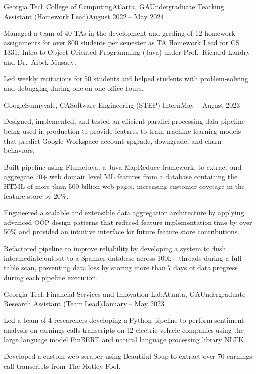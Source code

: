 \documentclass{article}
\begin{document}
\begin{flushleft}
    \begin{experience}{Georgia Tech College of Computing}{Atlanta, GA}{Undergraduate Teaching Assistant (Homework Lead)}{August 2022 -- May 2024}
        \item Managed a team of 40 TAs in the development and grading of 12 homework assignments for over 800 students per semester as TA Homework Lead for CS 1331: Intro to Object-Oriented Programming (Java) under Prof.~Richard Landry and Dr.~Aibek Musaev.
        \item Led weekly recitations for 50 students and helped students with problem-solving and debugging during one-on-one office hours.
    \end{experience}

    \begin{experience}{Google}{Sunnyvale, CA}{Software Engineering (STEP) Intern}{May -- August 2023}
        \item Designed, implemented, and tested an efficient parallel-processing data pipeline being used in production to provide features to train machine learning models that predict Google Workspace account upgrade, downgrade, and churn behaviors.
        \item Built pipeline using FlumeJava, a Java MapReduce framework, to extract and aggregate 70+ web domain level ML features from a database containing the HTML of more than 500 billion web pages, increasing customer coverage in the feature store by 20\%.
        \item Engineered a scalable and extensible data aggregation architecture by applying advanced OOP design patterns that reduced feature implementation time by over 50\% and provided an intuitive interface for future feature store contributions.
        \item Refactored pipeline to improve reliability by developing a system to flush intermediate output to a Spanner database across 100k+ threads during a full table scan, preventing data loss by storing more than 7 days of data progress during each pipeline execution.
    \end{experience}

    \begin{experience}{Georgia Tech Financial Services and Innovation Lab}{Atlanta, GA}{Undergraduate Research Assistant (Team Lead)}{January -- May 2023}
        \item Led a team of 4 researchers developing a Python pipeline to perform sentiment analysis on earnings calls transcripts on 12 electric vehicle companies using the large language model FinBERT and natural language processing library NLTK.
        \item Developed a custom web scraper using Beautiful Soup to extract over 70 earnings call transcripts from The Motley Fool.
    \end{experience}



\end{flushleft}
\end{document}
